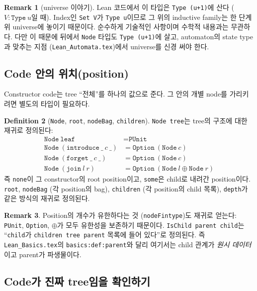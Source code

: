 \documentclass[11pt]{article}
\theoremstyle{definition}
\newtheorem{definition}{Definition}[section]
\newtheorem{remark}[definition]{Remark}
\theoremstyle{plain}
\newcommand{\lean}[1]{\texttt{#1}}
\newcommand{\leanfile}[1]{\texttt{#1}}
\begin{document}
\begin{remark}[universe 이야기]
Lean 코드에서 이 타입은 \lean{Type (u+1)}에 산다 ($V : \lean{Type}\ u$일 때).
Index인 \lean{Set V}가 \lean{Type u}이므로 그 위의 inductive family는 한 단계
위 universe에 놓이기 때문이다. 순수하게 기술적인 사항이며 수학적 내용과는
무관하다. 다만 이 때문에 뒤에서 \lean{Node} 타입도 \lean{Type (u+1)}에 살고,
automaton의 state type과 맞추는 지점 (\leanfile{Lean\_Automata.tex})에서
universe를 신경 써야 한다.
\end{remark}

\subsection{Code 안의 위치(position)}

Constructor code는 tree ``전체''를 하나의 값으로 준다. 그 안의 개별 node를
가리키려면 별도의 타입이 필요하다.

\begin{definition}[\lean{Node}, \lean{root}, \lean{nodeBag}, \lean{children}]
\label{nice:def:codenode}
\lean{Node tree}는 tree의 구조에 대한 재귀로 정의된다:
\[
\begin{array}{ll}
  \lean{Node}\ \lean{leaf} &= \lean{PUnit} \\
  \lean{Node}\ (\lean{introduce}\ \_\ c\ \_) &= \lean{Option}\ (\lean{Node}\ c) \\
  \lean{Node}\ (\lean{forget}\ \_\ c\ \_) &= \lean{Option}\ (\lean{Node}\ c) \\
  \lean{Node}\ (\lean{join}\ l\ r) &= \lean{Option}\ (\lean{Node}\ l \oplus \lean{Node}\ r)
\end{array}
\]
즉 \lean{none}이 그 constructor의 root position이고, \lean{some}은 child로
내려간 position이다. \lean{root}, \lean{nodeBag} (각 position의 bag),
\lean{children} (각 position의 child 목록), \lean{depth}가 같은 방식의 재귀로
정의된다.
\end{definition}

\begin{remark}
Position의 개수가 유한하다는 것 (\lean{nodeFintype})도 재귀로 얻는다:
\lean{PUnit}, \lean{Option}, $\oplus$가 모두 유한성을 보존하기 때문이다.
\lean{IsChild parent child}는 ``\lean{child}가 \lean{children tree parent}
목록에 들어 있다''로 정의된다. 즉 \leanfile{Lean\_Basics.tex}의
\lean{basics:def:parent}와 달리 여기서는 child 관계가 \emph{원시 데이터}이고
parent가 파생물이다.
\end{remark}

\subsection{Code가 진짜 tree임을 확인하기}
\end{document}
